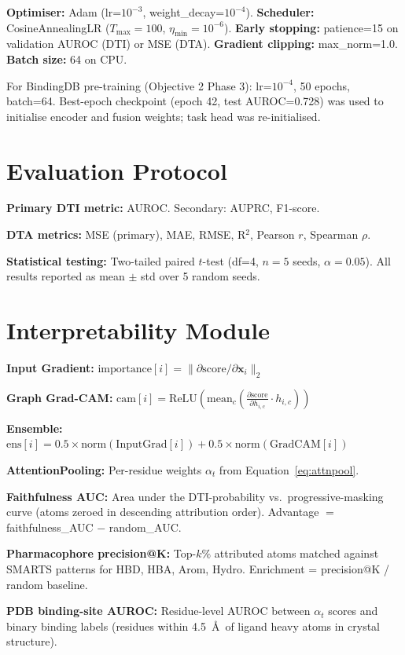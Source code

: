 \documentclass[12pt,a4paper,oneside]{report}
\begin{document}
\textbf{Optimiser:} Adam (lr=$10^{-3}$, weight\_decay=$10^{-4}$).\quad
\textbf{Scheduler:} CosineAnnealingLR ($T_{\max}=100$, $\eta_{\min}=10^{-6}$).\quad
\textbf{Early stopping:} patience=15 on validation AUROC (DTI) or MSE (DTA).\quad
\textbf{Gradient clipping:} max\_norm=1.0.\quad
\textbf{Batch size:} 64 on CPU.

For BindingDB pre-training (Objective 2 Phase 3): lr=$10^{-4}$, 50 epochs, batch=64. Best-epoch checkpoint (epoch 42, test AUROC=0.728) was used to initialise encoder and fusion weights; task head was re-initialised.

\section{Evaluation Protocol}

\textbf{Primary DTI metric:} AUROC. Secondary: AUPRC, F1-score.

\textbf{DTA metrics:} MSE (primary), MAE, RMSE, R$^2$, Pearson $r$, Spearman $\rho$.

\textbf{Statistical testing:} Two-tailed paired $t$-test (df=4, $n=5$ seeds, $\alpha=0.05$). All results reported as mean $\pm$ std over 5 random seeds.

\section{Interpretability Module}

\textbf{Input Gradient:}
$\text{importance}[i] = \|\partial\text{score}/\partial \mathbf{x}_i\|_2$

\textbf{Graph Grad-CAM:}
$\text{cam}[i] = \mathrm{ReLU}\!\left(\mathrm{mean}_c\!\left(\frac{\partial\text{score}}{\partial h_{i,c}} \cdot h_{i,c}\right)\right)$

\textbf{Ensemble:}
$\text{ens}[i] = 0.5 \times \mathrm{norm}(\text{InputGrad}[i]) + 0.5 \times \mathrm{norm}(\text{GradCAM}[i])$

\textbf{AttentionPooling:} Per-residue weights $\alpha_t$ from Equation~\ref{eq:attnpool}.

\textbf{Faithfulness AUC:} Area under the DTI-probability vs.\ progressive-masking curve (atoms zeroed in descending attribution order). Advantage $=$ faithfulness\_AUC $-$ random\_AUC.

\textbf{Pharmacophore precision@K:} Top-$k\%$ attributed atoms matched against SMARTS patterns for HBD, HBA, Arom, Hydro. Enrichment = precision@K / random baseline.

\textbf{PDB binding-site AUROC:} Residue-level AUROC between $\alpha_t$ scores and binary binding labels (residues within 4.5~\AA\ of ligand heavy atoms in crystal structure).
\end{document}
